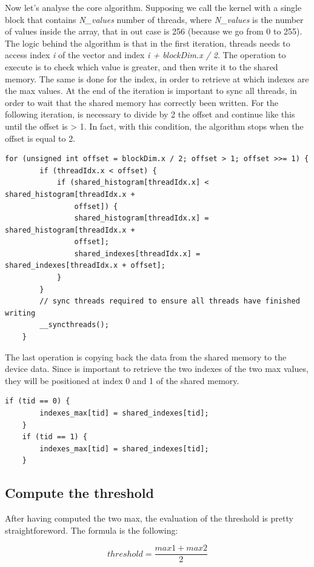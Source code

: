\documentclass[paper=a4, fontsize=10pt]{scrartcl}	%
\begin{document}
	Now let's analyse the core algorithm. Supposing we call the kernel with a single block that contains \textit{N\_values} number of threads, where \textit{N\_values} is the number of values inside the array, that in out case is 256 (because we go from 0 to 255). The logic behind the algorithm is that in the first iteration, threads needs to access index \textit{i} of the vector and index \textit{i + blockDim.x / 2}. The operation to execute is to check which value is greater, and then write it to the shared memory. The same is done for the index, in order to retrieve at which indexes are the max values. 
	At the end of the iteration is important to sync all threads, in order to wait that the shared memory has correctly been written. For the following iteration, is necessary to divide by 2 the offset and continue like this until the offset is > 1. In fact, with this condition, the algorithm stops when the offset is equal to 2.

	\begin{lstlisting}[style=CStyle]
	for (unsigned int offset = blockDim.x / 2; offset > 1; offset >>= 1) {
		if (threadIdx.x < offset) {
			if (shared_histogram[threadIdx.x] < shared_histogram[threadIdx.x + 
				offset]) {
				shared_histogram[threadIdx.x] = shared_histogram[threadIdx.x + 
				offset];
				shared_indexes[threadIdx.x] = shared_indexes[threadIdx.x + offset];
			}
		}
		// sync threads required to ensure all threads have finished writing
		__syncthreads();
	}
	\end{lstlisting}

	The last operation is copying back the data from the shared memory to the device data. Since is important to retrieve the two indexes of the two max values, they will be positioned at index 0 and 1 of the shared memory.

	\begin{lstlisting}[style=CStyle]
	if (tid == 0) {
		indexes_max[tid] = shared_indexes[tid];
	}
	if (tid == 1) {
		indexes_max[tid] = shared_indexes[tid];
	}
	\end{lstlisting}

	\subsection{Compute the threshold}

	After having computed the two max, the evaluation of the threshold is pretty straightforeword. The formula is the following:

	\begin{equation*}
		threshold = \frac{max1 + max2}{2}
	\end{equation*}
\end{document}
